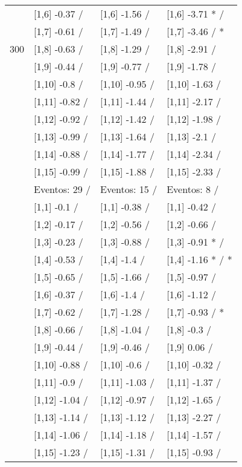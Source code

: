 \begin{table}
\begin{tabular}[t]{llll}
 & {}[1,6] -0.37  / & {}[1,6] -1.56  / & {}[1,6] -3.71 * /\\
 & {}[1,7] -0.61  / & {}[1,7] -1.49  / & {}[1,7] -3.46  / *\\
300 & {}[1,8] -0.63  / & {}[1,8] -1.29  / & {}[1,8] -2.91  /\\
\addlinespace
 & {}[1,9] -0.44  / & {}[1,9] -0.77  / & {}[1,9] -1.78  /\\
 & {}[1,10] -0.8  / & {}[1,10] -0.95  / & {}[1,10] -1.63  /\\
 & {}[1,11] -0.82  / & {}[1,11] -1.44  / & {}[1,11] -2.17  /\\
 & {}[1,12] -0.92  / & {}[1,12] -1.42  / & {}[1,12] -1.98  /\\
 & {}[1,13] -0.99  / & {}[1,13] -1.64  / & {}[1,13] -2.1  /\\
\addlinespace
 & {}[1,14] -0.88  / & {}[1,14] -1.77  / & {}[1,14] -2.34  /\\
 & {}[1,15] -0.99  / & {}[1,15] -1.88  / & {}[1,15] -2.33  /\\
 & Eventos:  29 / & Eventos:  15 / & Eventos:  8 /\\
 & {}[1,1] -0.1  / & {}[1,1] -0.38  / & {}[1,1] -0.42  /\\
 & {}[1,2] -0.17  / & {}[1,2] -0.56  / & {}[1,2] -0.66  /\\
\addlinespace
 & {}[1,3] -0.23  / & {}[1,3] -0.88  / & {}[1,3] -0.91 * /\\
 & {}[1,4] -0.53  / & {}[1,4] -1.4  / & {}[1,4] -1.16 * / *\\
 & {}[1,5] -0.65  / & {}[1,5] -1.66  / & {}[1,5] -0.97  /\\
 & {}[1,6] -0.37  / & {}[1,6] -1.4  / & {}[1,6] -1.12  /\\
 & {}[1,7] -0.62  / & {}[1,7] -1.28  / & {}[1,7] -0.93  / *\\
\addlinespace
500 & {}[1,8] -0.66  / & {}[1,8] -1.04  / & {}[1,8] -0.3  /\\
 & {}[1,9] -0.44  / & {}[1,9] -0.46  / & {}[1,9] 0.06  /\\
 & {}[1,10] -0.88  / & {}[1,10] -0.6  / & {}[1,10] -0.32  /\\
 & {}[1,11] -0.9  / & {}[1,11] -1.03  / & {}[1,11] -1.37  /\\
 & {}[1,12] -1.04  / & {}[1,12] -0.97  / & {}[1,12] -1.65  /\\
\addlinespace
 & {}[1,13] -1.14  / & {}[1,13] -1.12  / & {}[1,13] -2.27  /\\
 & {}[1,14] -1.06  / & {}[1,14] -1.18  / & {}[1,14] -1.57  /\\
 & {}[1,15] -1.23  / & {}[1,15] -1.31  / & {}[1,15] -0.93  /\\
\bottomrule
\end{tabular}
\end{table}
